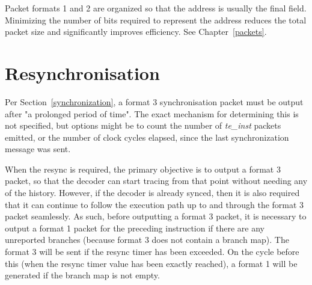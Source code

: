Packet formats 1 and 2 are organized so that the address is usually the final field.  Minimizing the 
number of bits required to represent the address reduces the total packet size and significantly
improves efficiency.  See Chapter~\ref{packets}.

\section{Resynchronisation} \label{sec:resync}

Per Section~\ref{synchronization}, a format 3 synchronisation packet must be output after "a prolonged
period of time". The exact mechanism for
determining this is not specified, but options might be to count the number of \textit{te\_inst} packets emitted, 
or the number of clock cycles elapsed, since the last synchronization message was sent.

When the resync is required, the primary objective is to output a format 3 packet, so that the decoder can 
start tracing from that point without needing any of the history.  However, if the decoder is already synced, 
then it is also required that it can continue to follow the execution path up to and through the format 3 packet 
seamlessly.  As such, before outputting a format 3 packet, it is necessary to output a format 1 packet for the 
preceding instruction if there are any unreported branches (because format 3 does not contain a branch map).  
The format 3 will be sent if the resync timer has been exceeded.  On the cycle before this (when the resync timer 
value has been exactly reached), a format 1 will be generated if the branch map is not empty.
